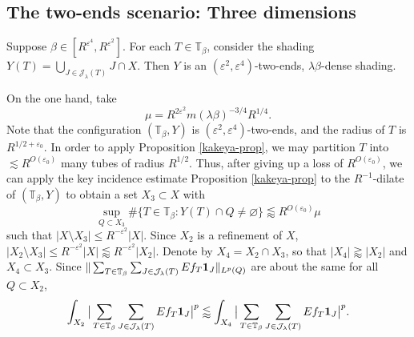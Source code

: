 \documentclass{amsart}
\numberwithin{equation}{section}
\newcommand{\be}{\beta}
\newcommand{\e}{\varepsilon}
\newcommand{\la}{\lambda}
\newcommand{\cj}{\mathcal J}
\newcommand{\ZT}{\mathbb{T}}
\newcommand{\Id}{{\bf 1}}
\begin{document}
\medskip

\subsection{The two-ends scenario: Three dimensions}

Suppose $\be\in[R^{\e^{4}},R^{\e^2}]$. 
For each $T\in\ZT_\be$, consider the shading $Y(T)=\bigcup_{J\in\cj_\la(T)}J\cap X$.
Then $Y$ is an $(\e^2, \e^{4})$-two-ends, $\la\be$-dense shading.


On the one hand, take
\begin{equation}
\label{mu}
    \mu=R^{2\e^{2}}m(\la\be)^{-3/4}R^{1/4}.
\end{equation}
Note that the configuration $(\ZT_\be, Y)$ is $(\e^2,\e^4)$-two-ends, and the radius of $T$ is $R^{1/2+\e_0}$.
In order to apply Proposition \ref{kakeya-prop}, we may partition $T$ into $\lesssim R^{O(\e_0)}$ many tubes of radius $R^{1/2}$.
Thus, after giving up a loss of $R^{O(\e_0)}$, we can apply the key incidence estimate  Proposition \ref{kakeya-prop} to the $R^{-1}$-dilate of $(\ZT_\be, Y)$ to obtain a set $X_3\subset X$ with
\begin{equation}
\label{multi-R-half}
    \sup_{Q\subset X_3}\#\{T\in\ZT_\be:Y(T)\cap Q\not=\varnothing\}\lessapprox R^{O(\e_0)}\mu
\end{equation}
such that $|X\setminus X_3|\leq R^{-\e^2}|X|$. 
Since $X_2$ is a refinement of $X$,  $|X_2\setminus X_3|\leq R^{-\e^2}|X|\lessapprox R^{-\e^2}|X_2|$. 
Denote by $X_4=X_2\cap X_3$, so that $|X_4|\gtrapprox|X_2|$ and $X_4\subset X_3$. 
Since $\|\sum_{T\in\ZT_\be}\sum_{J\in\cj_{\la}(T)}Ef_{T}\Id_J\|_{L^p(Q)}$ are about the same for all $Q\subset X_2$, 
\begin{equation}
\label{X-4-1}
    \int_{X_2}\big|\sum_{T\in\ZT_\be}\sum_{J\in\cj_\la(T)}Ef_{T}\Id_J\big|^p\lessapprox\int_{X_4}\big|\sum_{T\in\ZT_\be}\sum_{J\in\cj_\la(T)}Ef_{T}\Id_J\big|^p.
\end{equation}
\end{document}
